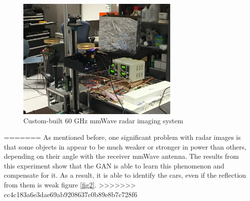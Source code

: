 \begin{figure}
\centering
\includegraphics[width=8cm,height=6cm]{./figure/experiment_setup.jpg}
\caption{Custom-built 60 GHz mmWave radar imaging system}
\end{figure}

\fi
=======
As mentioned before, one significant problem with radar images is that some objects in appear to be much weaker or stronger in power than others, depending on their angle with the receiver mmWave antenna. The results from this experiment show that the GAN is able to learn this phenomenon and compensate for it. As a result, it is able to identify the cars, even if the reflection from them is weak figure \ref{fig2}. 
>>>>>>> cc4c183a6e3dae69ab9208637c0b89e8b7c728f6
